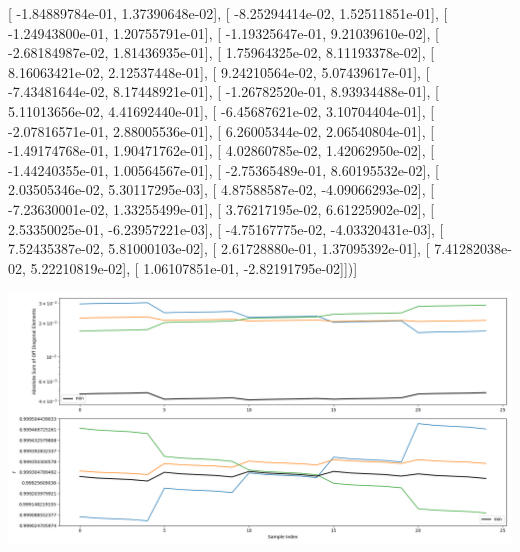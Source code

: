 \documentclass{article}
\begin{document}
       [ -1.84889784e-01,   1.37390648e-02],
       [ -8.25294414e-02,   1.52511851e-01],
       [ -1.24943800e-01,   1.20755791e-01],
       [ -1.19325647e-01,   9.21039610e-02],
       [ -2.68184987e-02,   1.81436935e-01],
       [  1.75964325e-02,   8.11193378e-02],
       [  8.16063421e-02,   2.12537448e-01],
       [  9.24210564e-02,   5.07439617e-01],
       [ -7.43481644e-02,   8.17448921e-01],
       [ -1.26782520e-01,   8.93934488e-01],
       [  5.11013656e-02,   4.41692440e-01],
       [ -6.45687621e-02,   3.10704404e-01],
       [ -2.07816571e-01,   2.88005536e-01],
       [  6.26005344e-02,   2.06540804e-01],
       [ -1.49174768e-01,   1.90471762e-01],
       [  4.02860785e-02,   1.42062950e-02],
       [ -1.44240355e-01,   1.00564567e-01],
       [ -2.75365489e-01,   8.60195532e-02],
       [  2.03505346e-02,   5.30117295e-03],
       [  4.87588587e-02,  -4.09066293e-02],
       [ -7.23630001e-02,   1.33255499e-01],
       [  3.76217195e-02,   6.61225902e-02],
       [  2.53350025e-01,  -6.23957221e-03],
       [ -4.75167775e-02,  -4.03320431e-03],
       [  7.52435387e-02,   5.81000103e-02],
       [  2.61728880e-01,   1.37095392e-01],
       [  7.41282038e-02,   5.22210819e-02],
       [  1.06107851e-01,  -2.82191795e-02]])]
\begin{center}
\includegraphics[scale=.9]{report_pickled_controls184/control_dpn_all.png}

\end{center}
\end{document}
